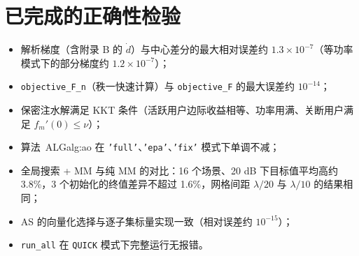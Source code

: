 \documentclass[11pt,a4paper]{ctexart}
\newcommand{\code}[1]{\texttt{#1}}
\begin{document}
\section{已完成的正确性检验}
\begin{itemize}
\item 解析梯度（含附录 B 的 $\dot d$）与中心差分的最大相对误差约 $1.3\times10^{-7}$（等功率模式下的部分梯度约 $1.2\times10^{-7}$）；
\item \code{objective\_F\_n}（秩一快速计算）与 \code{objective\_F} 的最大误差约 $10^{-14}$；
\item 保密注水解满足 KKT 条件（活跃用户边际收益相等、功率用满、关断用户满足 $f_m'(0)\le\nu$）；
\item 算法~ALG{alg:ao} 在 \code{'full'}、\code{'epa'}、\code{'fix'} 模式下单调不减；
\item 全局搜索 + MM 与纯 MM 的对比：16 个场景、20 dB 下目标值平均高约 3.8\%，3 个初始化的终值差异不超过 1.6\%，网格间距 $\lambda/20$ 与 $\lambda/10$ 的结果相同；
\item AS 的向量化选择与逐子集标量实现一致（相对误差约 $10^{-15}$）；
\item \code{run\_all} 在 \code{QUICK} 模式下完整运行无报错。
\end{itemize}
\end{document}
